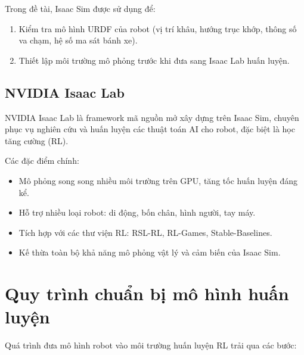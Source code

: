 Trong đề tài, Isaac Sim được sử dụng để:
\begin{enumerate}
    \item Kiểm tra mô hình URDF của robot (vị trí khâu, hướng trục khớp,
    thông số va chạm, hệ số ma sát bánh xe).
    \item Thiết lập môi trường mô phỏng trước khi đưa sang Isaac Lab huấn luyện.
\end{enumerate}

\subsection{NVIDIA Isaac Lab}

NVIDIA Isaac Lab là framework mã nguồn mở xây dựng trên Isaac Sim, chuyên phục
vụ nghiên cứu và huấn luyện các thuật toán AI cho robot, đặc biệt là học tăng
cường (RL).

Các đặc điểm chính:
\begin{itemize}
    \item Mô phỏng song song nhiều môi trường trên GPU, tăng tốc huấn luyện
    đáng kể.
    \item Hỗ trợ nhiều loại robot: di động, bốn chân, hình người, tay máy.
    \item Tích hợp với các thư viện RL: RSL-RL, RL-Games, Stable-Baselines.
    \item Kế thừa toàn bộ khả năng mô phỏng vật lý và cảm biến của Isaac Sim.
\end{itemize}


\section{Quy trình chuẩn bị mô hình huấn luyện}

Quá trình đưa mô hình robot vào môi trường huấn luyện RL trải qua các bước:

